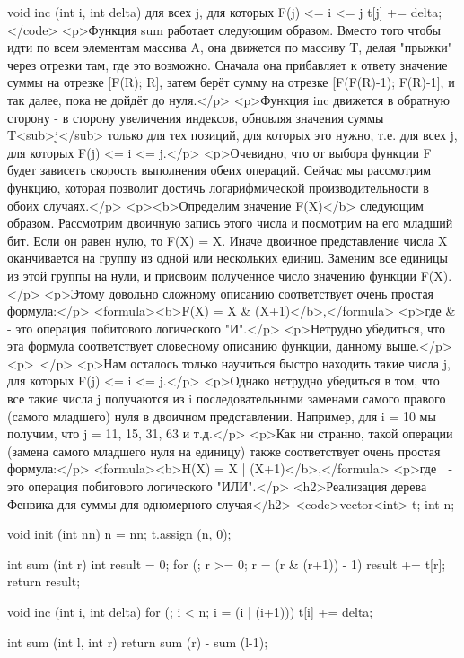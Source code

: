 void inc (int i, int delta)
{
	для всех j, для которых F(j) <= i <= j
	{
		t[j] += delta;
	}
}</code>
<p>Функция sum работает следующим образом. Вместо того чтобы идти по всем элементам массива A, она движется по массиву T, делая "прыжки" через отрезки там, где это возможно. Сначала она прибавляет к ответу значение суммы на отрезке [F(R); R], затем берёт сумму на отрезке [F(F(R)-1); F(R)-1], и так далее, пока не дойдёт до нуля.</p>
<p>Функция inc движется в обратную сторону - в сторону увеличения индексов, обновляя значения суммы T<sub>j</sub> только для тех позиций, для которых это нужно, т.е. для всех j, для которых F(j) <= i <= j.</p>
<p>Очевидно, что от выбора функции F будет зависеть скорость выполнения обеих операций. Сейчас мы рассмотрим функцию, которая позволит достичь логарифмической производительности в обоих случаях.</p>
<p><b>Определим значение F(X)</b> следующим образом. Рассмотрим двоичную запись этого числа и посмотрим на его младший бит. Если он равен нулю, то F(X) = X. Иначе двоичное представление числа X оканчивается на группу из одной или нескольких единиц. Заменим все единицы из этой группы на нули, и присвоим полученное число значению функции F(X).</p>
<p>Этому довольно сложному описанию соответствует очень простая формула:</p>
<formula><b>F(X) = X & (X+1)</b>,</formula>
<p>где & - это операция побитового логического "И".</p>
<p>Нетрудно убедиться, что эта формула соответствует словесному описанию функции, данному выше.</p>
<p> </p>
<p>Нам осталось только научиться быстро находить такие числа j, для которых F(j) <= i <= j.</p>
<p>Однако нетрудно убедиться в том, что все такие числа j получаются из i последовательными заменами самого правого (самого младшего) нуля в двоичном представлении. Например, для i = 10 мы получим, что j = 11, 15, 31, 63 и т.д.</p>
<p>Как ни странно, такой операции (замена самого младшего нуля на единицу) также соответствует очень простая формула:</p>
<formula><b>H(X) = X | (X+1)</b>,</formula>
<p>где | - это операция побитового логического "ИЛИ".</p>
<h2>Реализация дерева Фенвика для суммы для одномерного случая</h2>
<code>vector<int> t;
int n;

void init (int nn)
{
	n = nn;
	t.assign (n, 0);
}

int sum (int r)
{
	int result = 0;
	for (; r >= 0; r = (r & (r+1)) - 1)
		result += t[r];
	return result;
}

void inc (int i, int delta)
{
	for (; i < n; i = (i | (i+1)))
		t[i] += delta;
}

int sum (int l, int r)
{
	return sum (r) - sum (l-1);
}

